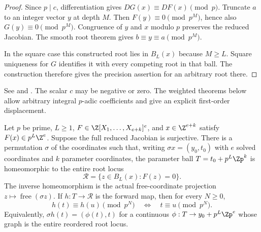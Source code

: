 \begin{proof}
Since $p\mid c$, differentiation gives
$DG(x)\equiv DF(x)\pmod p$. Truncate $a$ to an integer vector $y$ at
depth $M$. Then $F(y)\equiv0\pmod{p^M}$, hence also
$G(y)\equiv0\pmod{p^M}$. Congruence of $y$ and $x$ modulo $p$ preserves
the reduced Jacobian. The smooth root theorem gives
$b\equiv y\equiv a\pmod{p^M}$.

In the square case this constructed root lies in $B_L(x)$ because $M\ge L$.
Square uniqueness for $G$ identifies it with every competing root in that
ball. The construction therefore gives the precision assertion for an
arbitrary root there.
\end{proof}

See 
and .
The scalar $c$ may be negative or zero. The weighted theorems below allow
arbitrary integral $p$-adic coefficients and give an explicit first-order
displacement.

\begin{theorem}
\label{thm:continuous-parameter-chart}
Let $p$ be prime, $L\ge1$,
$F\in\Z[X_1,\ldots,X_{e+k}]^e$, and $x\in\Z^{e+k}$ satisfy
$F(x)\in p^L\Z^e$. Suppose the full reduced Jacobian is surjective.
There is a permutation $\sigma$ of the coordinates such that, writing
$\sigma x=(y_0,t_0)$ with $e$ solved coordinates and $k$ parameter
coordinates, the parameter ball
$T=t_0+p^L\Zp^k$ is homeomorphic to the entire root locus
\[
 \mathcal R=\{z\in B_L(x):F(z)=0\}.
\]
The inverse homeomorphism is the actual free-coordinate projection
$z\mapsto\operatorname{free}(\sigma z)$. If $h:T\to\mathcal R$ is the
forward map, then for every $N\ge0$,
\begin{equation}\label{eq:chart-congruence}
 h(t)\equiv h(u)\pmod{p^N}
 \quad\Longleftrightarrow\quad t\equiv u\pmod{p^N}.
\end{equation}
Equivalently, $\sigma h(t)=(\phi(t),t)$ for a continuous
$\phi:T\to y_0+p^L\Zp^e$ whose graph is the entire reordered root locus.
\end{theorem}

